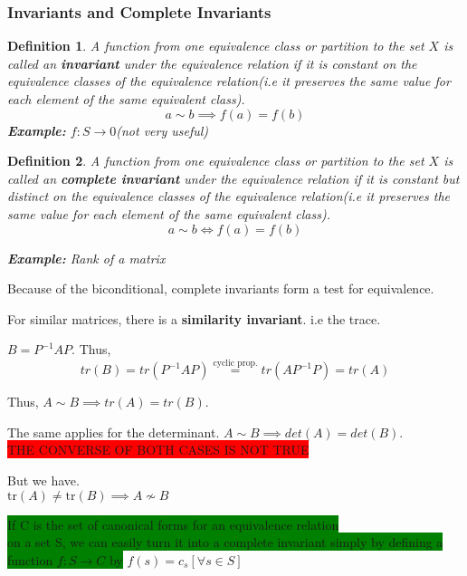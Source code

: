 \documentclass[12pt]{article}
\let\to=\rightarrow
\newcommand{\mybox}[2][black]{\colorbox{#1}{#2}}
\newtheorem{definition}{Definition}
\begin{document}
\subsubsection{Invariants and Complete Invariants}

\begin{definition}
 A function from one equivalence class or partition to the set $X$ is called an \textbf{invariant} under the equivalence relation if it is constant on the equivalence classes of the equivalence relation(i.e it preserves the same value for each element of the same equivalent class).\\
\[ a \sim b \implies f(a) = f(b) \]
\textbf{Example:} $f: S \to 0$(not very useful)
\end{definition}

\begin{definition}
 A function from one equivalence class or partition to the set $X$ is called an \textbf{complete invariant} under the equivalence relation if it is constant but distinct on the equivalence classes of the equivalence relation(i.e it preserves the same value for each element of the same equivalent class).
\[ a \sim b \iff f(a) = f(b)\]

\textbf{Example:} Rank of a matrix
\end{definition}

Because of the biconditional, complete invariants form a test for equivalence.

For similar matrices, there is a \textbf{similarity invariant}. i.e the trace.

\( B = P^{-1}A P \). Thus, 
\[ tr(B) = tr( P^{-1}A P) \stackrel{\text{cyclic prop.}}{=} tr( AP^{-1} P) = tr(A)\]

Thus,  \(A \sim B \implies tr(A) = tr(B)\).

The same applies for the determinant. \(A \sim B \implies det(A) = det(B)\).\\

 \mybox[red]{THE CONVERSE OF BOTH CASES IS NOT TRUE}

But we have.\\

\( \text{tr}(A) \neq \text{tr}(B) \implies A \not\sim B \)

\mybox[green]{If C is the set of canonical forms for an equivalence relation} \\ \mybox[green]{ on a set S, we can easily turn it into a complete invariant simply by defining a function $f: S \to C$ by} \(f(s) = c_s [\forall s \in S]\)\\
\end{document}
